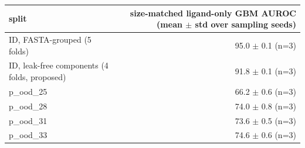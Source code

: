 \begin{tabular}{lr}
\toprule
split & size-matched ligand-only GBM AUROC (mean $\pm$ std over sampling seeds) \\ \midrule
ID, FASTA-grouped (5 folds) & 95.0 $\pm$ 0.1 (n=3) \\
ID, leak-free components (4 folds, proposed) & 91.8 $\pm$ 0.1 (n=3) \\
p\_ood\_25 & 66.2 $\pm$ 0.6 (n=3) \\
p\_ood\_28 & 74.0 $\pm$ 0.8 (n=3) \\
p\_ood\_31 & 73.6 $\pm$ 0.5 (n=3) \\
p\_ood\_33 & 74.6 $\pm$ 0.6 (n=3) \\
\bottomrule
\end{tabular}
